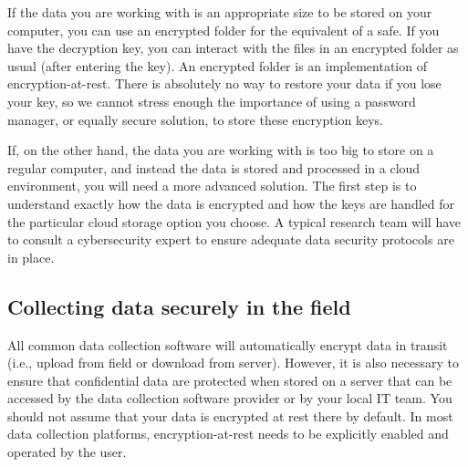 If the data you are working with is an appropriate size to be stored on your computer,
you can use an encrypted folder for the equivalent of a safe.
If you have the decryption key, you can interact with the files in an encrypted folder as usual (after entering the key).
An encrypted folder is an implementation of encryption-at-rest.
There is absolutely no way to restore your data if you lose your key,
so we cannot stress enough the importance of using a password manager,
or equally secure solution, to store these encryption keys.

If, on the other hand, the data you are working with is too big to store on a regular computer,
and instead the data is stored and processed in a cloud environment,
you will need a more advanced solution. 
The first step is to understand exactly how the data is encrypted
and how the keys are handled for the particular cloud storage option you choose.
A typical research team
will have to consult a cybersecurity expert to ensure adequate data security protocols are in place.

\subsection{Collecting data securely in the field}

All common data collection software will automatically encrypt
data in transit (i.e., upload from field or download from server).
However, it is also necessary to ensure that confidential data
are protected when stored on a server that can be accessed
by the data collection software provider or by your local IT team.
You should not assume that your data is encrypted at rest there by default.
In most data collection platforms,
encryption-at-rest needs to be explicitly enabled and operated by the user.

